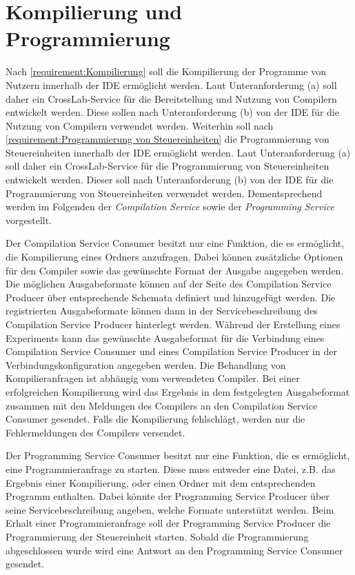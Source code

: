 \section{Kompilierung und Programmierung}\label{section:konzeption:kompilierung-und-programmierung}

Nach \autoref{requirement:Kompilierung} soll die Kompilierung der Programme von Nutzern innerhalb der IDE ermöglicht werden. Laut Unteranforderung (a) soll daher ein CrossLab-Service für die Bereitstellung und Nutzung von Compilern entwickelt werden. Diese sollen nach Unteranforderung (b) von der IDE für die Nutzung von Compilern verwendet werden. Weiterhin soll nach \autoref{requirement:Programmierung von Steuereinheiten} die Programmierung von Steuereinheiten innerhalb der IDE ermöglicht werden. Laut Unteranforderung (a) soll daher ein CrossLab-Service für die Programmierung von Steuereinheiten entwickelt werden. Dieser soll nach Unteranforderung (b) von der IDE für die Programmierung von Steuereinheiten verwendet werden. Dementsprechend werden im Folgenden der \textit{Compilation Service} sowie der \textit{Programming Service} vorgestellt.

Der Compilation Service Consumer besitzt nur eine Funktion, die es ermöglicht, die Kompilierung eines Ordners anzufragen. Dabei können zusätzliche Optionen für den Compiler sowie das gewünschte Format der Ausgabe angegeben werden. Die möglichen Ausgabeformate können auf der Seite des Compilation Service Producer über entsprechende Schemata definiert und hinzugefügt werden. Die registrierten Ausgabeformate können dann in der Servicebeschreibung des Compilation Service Producer hinterlegt werden. Während der Erstellung eines Experiments kann das gewünschte Ausgabeformat für die Verbindung eines Compilation Service Consumer und eines Compilation Service Producer in der Verbindungskonfiguration angegeben werden. Die Behandlung von Kompilieranfragen ist abhängig vom verwendeten Compiler. Bei einer erfolgreichen Kompilierung wird das Ergebnis in dem festgelegten Ausgabeformat zusammen mit den Meldungen des Compilers an den Compilation Service Consumer gesendet. Falls die Kompilierung fehlschlägt, werden nur die Fehlermeldungen des Compilers versendet.

Der Programming Service Consumer besitzt nur eine Funktion, die es ermöglicht, eine Programmieranfrage zu starten. Diese muss entweder eine Datei, z.B. das Ergebnis einer Kompilierung, oder einen Ordner mit dem entsprechenden Programm enthalten. Dabei könnte der Programming Service Producer über seine Servicebeschreibung angeben, welche Formate unterstützt werden. Beim Erhalt einer Programmieranfrage soll der Programming Service Producer die Programmierung der Steuereinheit starten. Sobald die Programmierung abgeschlossen wurde wird eine Antwort an den Programming Service Consumer gesendet.


